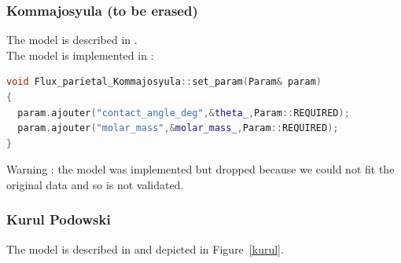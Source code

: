 \subsubsection{Kommajosyula (to be erased)}
The model is described in \textcite{Ravik2020}.\\
The model is implemented in :
\begin{lstlisting}[language=c++]
void Flux_parietal_Kommajosyula::set_param(Param& param)
{
  param.ajouter("contact_angle_deg",&theta_,Param::REQUIRED);
  param.ajouter("molar_mass",&molar_mass_,Param::REQUIRED);
}
\end{lstlisting}
{\color{red} Warning} : the model was implemented but dropped because we could not fit the original data and so is not validated.

\subsubsection{Kurul Podowski}
The model is described in \textcite{kurul1991modeling} and depicted in Figure~\ref{kurul}.


